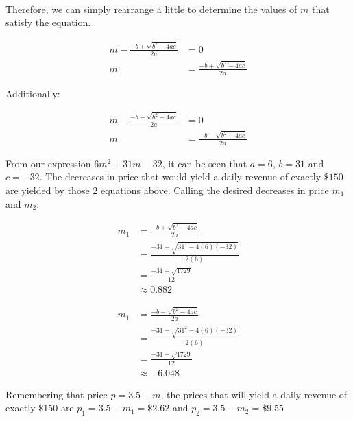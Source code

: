 \documentclass[12pt]{article}
\begin{document}
\newpage\

Therefore, we can simply rearrange a little to determine the values of $m$ that satisfy the equation.

\begin{align*}
m - \frac{-b + \sqrt{b^2 - 4ac}}{2a} &= 0\\
m &= \frac{-b + \sqrt{b^2 - 4ac}}{2a}
\end{align*}

Additionally:

\begin{align*}
m - \frac{-b - \sqrt{b^2 - 4ac}}{2a} &= 0\\
m &= \frac{-b - \sqrt{b^2 - 4ac}}{2a}
\end{align*}

From our expression $6m^2 + 31m - 32$, it can be seen that $a = 6$, $b = 31$ and $c=-32$. The decreases in price that would yield a daily revenue of exactly $\$150$ are yielded by those 2 equations above.
Calling the desired decreases in price $m_1$ and $m_2$:

\begin{align*}
m_1 &= \frac{-b + \sqrt{b^2 - 4ac}}{2a}\\
    &= \frac{-31 + \sqrt{31^2 - 4(6)(-32)}}{2(6)}\\
    &= \frac{-31 + \sqrt{1729}}{12}\\
    &\approx 0.882
\end{align*}

\begin{align*}
m_1 &= \frac{-b - \sqrt{b^2 - 4ac}}{2a}\\
    &= \frac{-31 - \sqrt{31^2 - 4(6)(-32)}}{2(6)}\\
    &= \frac{-31 - \sqrt{1729}}{12}\\
    &\approx -6.048
\end{align*}

Remembering that price $p = 3.5 - m$, the prices that will yield a daily revenue of exactly $\$150$ are $p_1 = 3.5 - m_1 = \boxed{\$2.62}$ and $p_2 = 3.5 - m_2 = \boxed{\$9.55}$
\end{document}
